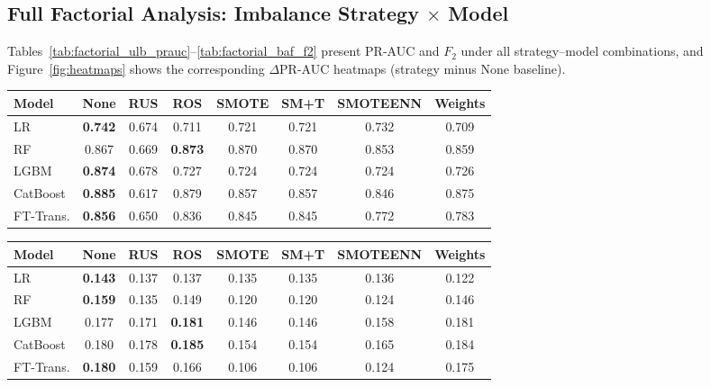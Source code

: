 \documentclass[a4paper,fleqn]{cas-sc}
\begin{document}
\subsection{Full Factorial Analysis: Imbalance Strategy \texorpdfstring{$\times$}{x} Model}
\label{subsec:factorial}

Tables~\ref{tab:factorial_ulb_prauc}--\ref{tab:factorial_baf_f2} present PR-AUC and
$F_2$ under all strategy--model combinations, and Figure~\ref{fig:heatmaps} shows the
corresponding $\Delta$PR-AUC heatmaps (strategy minus None baseline).

\par\medskip\noindent\begin{minipage}{\linewidth}\centering
{}
\label{tab:factorial_ulb_prauc}
\begin{tabular}{l c c c c c c c}
\toprule
Model & None & RUS & ROS & SMOTE & SM+T & SMOTEENN & Weights \\
\midrule
LR         & \textbf{0.742} & 0.674 & 0.711 & 0.721 & 0.721 & 0.732 & 0.709 \\
RF         & 0.867 & 0.669 & \textbf{0.873} & 0.870 & 0.870 & 0.853 & 0.859 \\
LGBM       & \textbf{0.874} & 0.678 & 0.727 & 0.724 & 0.724 & 0.724 & 0.726 \\
CatBoost   & \textbf{0.885} & 0.617 & 0.879 & 0.857 & 0.857 & 0.846 & 0.875 \\
FT-Trans.  & \textbf{0.856} & 0.650 & 0.836 & 0.845 & 0.845 & 0.772 & 0.783 \\
\bottomrule
\end{tabular}
\end{minipage}\par\medskip

\par\medskip\noindent\begin{minipage}{\linewidth}\centering
{}
\label{tab:factorial_baf_prauc}
\begin{tabular}{l c c c c c c c}
\toprule
Model & None & RUS & ROS & SMOTE & SM+T & SMOTEENN & Weights \\
\midrule
LR         & \textbf{0.143} & 0.137 & 0.137 & 0.135 & 0.135 & 0.136 & 0.122 \\
RF         & \textbf{0.159} & 0.135 & 0.149 & 0.120 & 0.120 & 0.124 & 0.146 \\
LGBM       & 0.177 & 0.171 & \textbf{0.181} & 0.146 & 0.146 & 0.158 & 0.181 \\
CatBoost   & 0.180 & 0.178 & \textbf{0.185} & 0.154 & 0.154 & 0.165 & 0.184 \\
FT-Trans.  & \textbf{0.180} & 0.159 & 0.166 & 0.106 & 0.106 & 0.124 & 0.175 \\
\bottomrule
\end{tabular}
\end{minipage}\par\medskip
\end{document}
